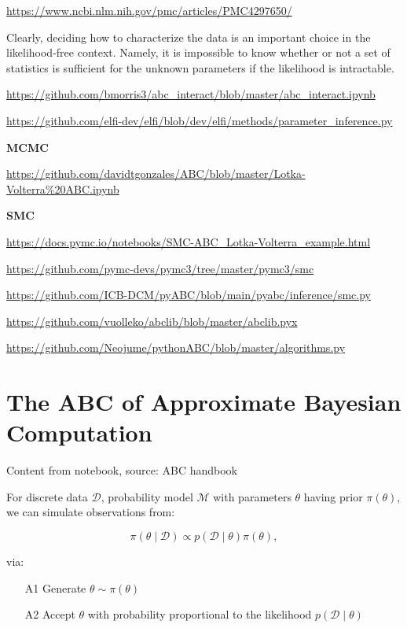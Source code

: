 \url{https://www.ncbi.nlm.nih.gov/pmc/articles/PMC4297650/}

Clearly, deciding how to characterize the data is an important choice in the likelihood-free context. Namely, it is impossible to know whether or not a set of statistics is sufficient for the unknown parameters if the likelihood is intractable.

\url{https://github.com/bmorris3/abc_interact/blob/master/abc_interact.ipynb}

\url{https://github.com/elfi-dev/elfi/blob/dev/elfi/methods/parameter_inference.py}

\textbf{MCMC} 

\url{https://github.com/davidtgonzales/ABC/blob/master/Lotka-Volterra%20ABC.ipynb}

\textbf{SMC} 

\url{https://docs.pymc.io/notebooks/SMC-ABC_Lotka-Volterra_example.html}

\url{https://github.com/pymc-devs/pymc3/tree/master/pymc3/smc}

\url{https://github.com/ICB-DCM/pyABC/blob/main/pyabc/inference/smc.py}

\url{https://github.com/vuolleko/abclib/blob/master/abclib.pyx}

\url{https://github.com/Neojume/pythonABC/blob/master/algorithms.py}


\section{The ABC of Approximate Bayesian Computation}\label{sec:abc_of_abc}

Content from notebook, source: ABC handbook

For discrete data $\mathcal{D}$, probability model $\mathcal{M}$ with parameters $\theta$ having prior $\pi(\theta)$, we can simulate observations from: 

\begin{equation}
    \pi (\theta \mid \mathcal{D}) \propto p(\mathcal{D} \mid \theta) \pi(\theta),
\end{equation}

via:

\begin{itemize}
    \item[A1] Generate $\theta \sim \pi(\theta)$
    \item[A2] Accept $\theta$ with probability proportional to the likelihood $p(\mathcal{D}\mid \theta)$
\end{itemize}
    
